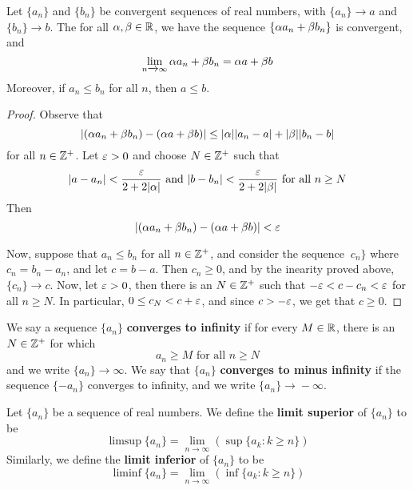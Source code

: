 \begin{theorem}\label{1.3.5}
    Let $\{a_n\}$ and $\{b_n\}$ be convergent sequences of real numbers, with
    $\{a_n\} \xrightarrow{} a$ and $\{b_n\} \xrightarrow{} b$. The for all
    $\alpha,\beta \in \mathbb{R}$, we have the sequence $\{\alpha a_n+\beta b_n\}$ is convergent, and
    \begin{equation*}
        \lim_{n \xrightarrow{} \infty}{\alpha a_n+\beta b_n}=\alpha a+\beta b
    \end{equation*}
    Moreover, if $a_n \leq b_n$ for all  $n$, then  $a \leq b$.
\end{theorem}
\begin{proof}
    Observe that
    \begin{equation*}
        |(\alpha a_n+\beta b_n)-(\alpha a+\beta b)| \leq |\alpha||a_n-a|+|\beta||b_n-b|
    \end{equation*}
    for all $n \in \mathbb{Z}^+$. Let  $\varepsilon>0$ and choose  $N \in \mathbb{Z}^+$ such that
    \begin{equation*}
        |a-a_n|<\frac{\varepsilon}{2+2|\alpha|} \text{ and } |b-b_n|<\frac{\varepsilon}{2+2|\beta|}
        \text{ for all } n \geq N
    \end{equation*}
    Then
    \begin{equation*}
        |(\alpha a_n+\beta b_n)-(\alpha a+\beta b)|<\varepsilon
    \end{equation*}

    Now, suppose that $a_n \leq b_n$ for all $n \in \mathbb{Z}^+$, and consider the
    sequence $\ c_n\}$ where $c_n=b_n-a_n$, and let $c=b-a$. Then $c_n \geq 0$,
    and by the  inearity proved above, $\{c_n\} \xrightarrow{} c$. Now, let
    $\varepsilon>0$, then there is an  $N \in \mathbb{Z}^+$ such that  $-\varepsilon<c-c_n<\varepsilon$ for all  $n
    \geq N$. In particular,  $0 \leq c_N<c+\varepsilon$, and since  $c>-\varepsilon$, we get that
     $c \geq 0$.
\end{proof}

\begin{definition}
    We say a sequence $\{a_n\}$ \textbf{converges to infinity} if for every $M
    \in \mathbb{R}$, there is an $N \in \mathbb{Z}^+$ for which
    \begin{equation*}
        a_n \geq M \text{ for all } n \geq N
    \end{equation*}
    and we write $\{a_n\} \xrightarrow{} \infty$. We say that $\{a_n\}$
    \textbf{converges to minus infinity} if the sequence $\{-a_n\}$ converges to
    infinity, and we write $\{a_n\} \xrightarrow{} -\infty$.
\end{definition}

\begin{definition}
    Let $\{a_n\}$ be a sequence of real numbers. We define the \textbf{limit
    superior} of $\{a_n\}$ to be
    \begin{equation*}
        \limsup{\{a_n\}}=\lim_{n \xrightarrow{} \infty}{(\sup{\{a_k :k \geq n\}})}
    \end{equation*}
    Similarly, we define the \textbf{limit inferior} of $\{a_n\}$ to be
    \begin{equation*}
        \liminf{\{a_n\}}=\lim_{n \xrightarrow{} \infty}{(\inf{\{a_k :k \geq n\}})}
    \end{equation*}
\end{definition}

